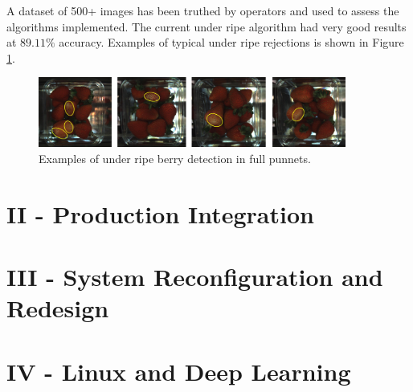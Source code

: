 \documentclass[fleqn,twoside]{article}
\begin{document}
A dataset of 500+ images has been truthed by operators and used to assess the algorithms implemented. The current under ripe algorithm had very good results at $89.11\%$ accuracy. Examples of typical under ripe rejections is shown in Figure \ref{fig:UR_berries}.


\begin{figure}[h]
	\centering
	\includegraphics[width=0.9\textwidth]{UR_berries.png}
	\caption{Examples of under ripe berry detection in full punnets.}
	\label{fig:UR_berries}
\end{figure}




\section{II - Production Integration}













\section{III - System Reconfiguration and Redesign}

















\section{IV - Linux and Deep Learning}
\end{document}

